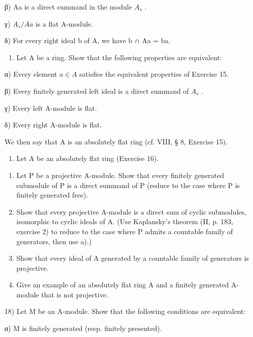 β) Aa is a direct summand in the module \(A_{s}\) .

γ) \(A_{s}/Aa\) is a flat A-module.

δ) For every right ideal b of A, we have b ∩ Aa = ba.

\begin{enumerate}
\def\labelenumi{\arabic{enumi})}
\setcounter{enumi}{15}
\tightlist
\item
  Let A be a ring. Show that the following properties are equivalent:
\end{enumerate}

α) Every element \(a \in A\) satisfies the equivalent properties of Exercise 15.

β) Every finitely generated left ideal is a direct summand of \(A_{s}\) .

γ) Every left A-module is flat.

δ) Every right A-module is flat.

We then say that A is an absolutely flat ring (cf. VIII, § 8, Exercise 15).

\begin{enumerate}
\def\labelenumi{\arabic{enumi})}
\setcounter{enumi}{16}
\tightlist
\item
  Let A be an absolutely flat ring (Exercise 16).
\end{enumerate}

\begin{enumerate}
\def\labelenumi{\alph{enumi})}
\item
  Let P be a projective A-module. Show that every finitely generated submodule of P is a direct summand of P (reduce to the case where P is finitely generated free).
\item
  Show that every projective A-module is a direct sum of cyclic submodules, isomorphic to cyclic ideals of A. (Use Kaplansky's theorem (II, p. 183, exercise 2) to reduce to the case where P admits a countable family of generators, then use a).)
\item
  Show that every ideal of A generated by a countable family of generators is projective.
\item
  Give an example of an absolutely flat ring A and a finitely generated A-module that is not projective.
\end{enumerate}

18) Let M be an A-module. Show that the following conditions are equivalent:

α) M is finitely generated (resp. finitely presented).

